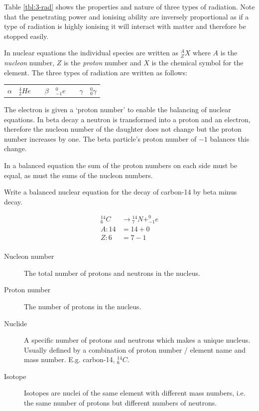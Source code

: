 \documentclass[main.tex]{subfiles}
\begin{document}
Table \ref{tbl:3-rad} shows the properties and nature of three types of radiation. Note that the penetrating power and ionising ability are inversely proportional as if a type of radiation is highly ionising it will interact with matter and therefore be stopped easily.

\newpage


In nuclear equations the individual species are written as $^A_Z X$ where $A$ is the \emph{nucleon} number, $Z$ is the \emph{proton} number and $X$ is the chemical symbol for the element. The three types of radiation are written as follows:
\begin{center}
  \begin{tabular}{llp{1cm}llp{1cm}ll}
    $\alpha$ & $^4_2 He$ & &
    $\beta$ & $^{0}_{-1} e$ & &
    $\gamma$ & $^0_0 \gamma$ \\
  \end{tabular}
\end{center}

The electron is given a `proton number' to enable the balancing of nuclear equations. In beta decay a neutron is transformed into a proton and an electron, therefore the nucleon number of the daughter does not change but the proton number increases by one. The beta particle's proton number of $-1$ balances this change.

In a balanced equation the sum of the proton numbers on each side must be equal, as must the sums of the nucleon numbers.

\begin{example}
  Write a balanced nuclear equation for the decay of carbon-14 by beta minus decay.

  \answer

  \begin{align*}
    ^{14}_6 C & \rightarrow  {}^{14}_7 N + ^{0}_{-1} e \\
    A: 14 &=  14 + 0 \\
    Z: 6 & =  7 - 1 \\
  \end{align*}
\end{example}


\begin{description}
  \item[Nucleon number] The total number of protons and neutrons in the nucleus.
  \item[Proton number] The number of protons in the nucleus.
  \item[Nuclide] A specific number of protons and neutrons which makes a unique nucleus. Usually defined by a combination of proton number / element name and mass number. E.g. carbon-14, $^{14}_6 C$.
  \item[Isotope] Isotopes are nuclei of the same element with different mass numbers, i.e. the same number of protons but different numbers of neutrons.
\end{description}
\end{document}
